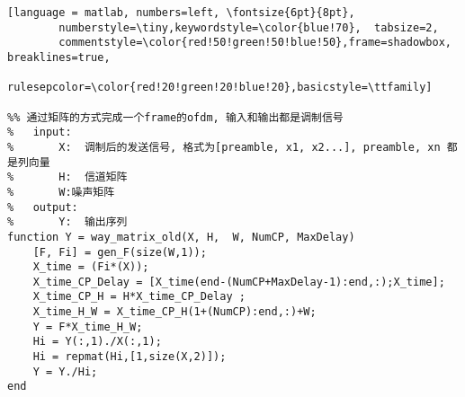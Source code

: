 
\begin{lstlisting}[language = matlab, numbers=left, \fontsize{6pt}{8pt}, 
        numberstyle=\tiny,keywordstyle=\color{blue!70},  tabsize=2,
        commentstyle=\color{red!50!green!50!blue!50},frame=shadowbox,  breaklines=true,
        rulesepcolor=\color{red!20!green!20!blue!20},basicstyle=\ttfamily]  

%% 通过矩阵的方式完成一个frame的ofdm, 输入和输出都是调制信号
%	input:
%		X:	调制后的发送信号, 格式为[preamble, x1, x2...], preamble, xn 都是列向量
%		H:	信道矩阵
%		W:噪声矩阵
%	output:
%		Y:	输出序列
function Y = way_matrix_old(X, H,  W, NumCP, MaxDelay)
	[F, Fi] = gen_F(size(W,1));
	X_time = (Fi*(X));
	X_time_CP_Delay = [X_time(end-(NumCP+MaxDelay-1):end,:);X_time];
	X_time_CP_H = H*X_time_CP_Delay ;
	X_time_H_W = X_time_CP_H(1+(NumCP):end,:)+W;
	Y = F*X_time_H_W;
	Hi = Y(:,1)./X(:,1);
	Hi = repmat(Hi,[1,size(X,2)]);
	Y = Y./Hi;
end
 \end{lstlisting}  
